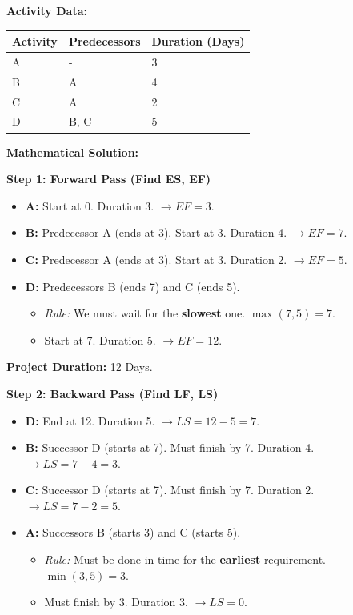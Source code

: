 \documentclass[
  letterpaper,
  DIV=11,
  numbers=noendperiod]{scrreprt}
\providecommand{\tightlist}{%
  \setlength{\itemsep}{0pt}\setlength{\parskip}{0pt}}
\begin{document}
\textbf{Activity Data:}

\begin{longtable}[]{@{}lll@{}}
\toprule\noalign{}
Activity & Predecessors & Duration (Days) \\
\midrule\noalign{}
\endhead
\bottomrule\noalign{}
\endlastfoot
A & - & 3 \\
B & A & 4 \\
C & A & 2 \\
D & B, C & 5 \\
\end{longtable}

\textbf{Mathematical Solution:}

\textbf{Step 1: Forward Pass (Find ES, EF)}

\begin{itemize}
\item
  \textbf{A:} Start at 0. Duration 3. \(\to EF = 3\).
\item
  \textbf{B:} Predecessor A (ends at 3). Start at 3. Duration 4.
  \(\to EF = 7\).
\item
  \textbf{C:} Predecessor A (ends at 3). Start at 3. Duration 2.
  \(\to EF = 5\).
\item
  \textbf{D:} Predecessors B (ends 7) and C (ends 5).

  \begin{itemize}
  \tightlist
  \item
    \emph{Rule:} We must wait for the \textbf{slowest} one.
    \(\max(7, 5) = 7\).
  \item
    Start at 7. Duration 5. \(\to EF = 12\).
  \end{itemize}
\end{itemize}

\textbf{Project Duration:} 12 Days.

\textbf{Step 2: Backward Pass (Find LF, LS)}

\begin{itemize}
\item
  \textbf{D:} End at 12. Duration 5. \(\to LS = 12 - 5 = 7\).
\item
  \textbf{B:} Successor D (starts at 7). Must finish by 7. Duration 4.
  \(\to LS = 7 - 4 = 3\).
\item
  \textbf{C:} Successor D (starts at 7). Must finish by 7. Duration 2.
  \(\to LS = 7 - 2 = 5\).
\item
  \textbf{A:} Successors B (starts 3) and C (starts 5).

  \begin{itemize}
  \tightlist
  \item
    \emph{Rule:} Must be done in time for the \textbf{earliest}
    requirement. \(\min(3, 5) = 3\).
  \item
    Must finish by 3. Duration 3. \(\to LS = 0\).
  \end{itemize}
\end{itemize}
\end{document}
